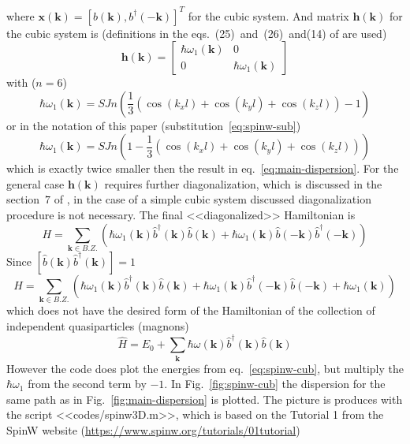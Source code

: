 \documentclass[a4paper,12pt]{article}
\begin{document}
        where $\mathbf{x}(\mathbf{k}) = [b(\mathbf{k}), b^{\dag}(-\mathbf{k})]^T$ for the cubic system. 
        And matrix $\mathbf{h}(\mathbf{k})$ for the cubic system is (definitions in the eqs.~(25)~and~(26)~and(14) of \cite{toth2015linear} are used)
        \begin{equation}
            \mathbf{h}(\mathbf{k}) = 
            \begin{bmatrix}
                \hbar\omega_1(\mathbf{k}) & 0 \\
                0 & \hbar\omega_1(\mathbf{k})
            \end{bmatrix}
        \end{equation}
        with ($n = 6$)
        \begin{equation}
            \hbar\omega_1(\mathbf{k}) = SJn\left(\dfrac{1}{3}\left(\cos(k_xl) + \cos(k_yl) + \cos(k_zl)\right) - 1\right)
        \end{equation}
        or in the notation of this paper (substitution~\eqref{eq:spinw-sub})
        \begin{equation}
            \hbar\omega_1(\mathbf{k}) = SJn\left(1 - \dfrac{1}{3}\left(\cos(k_xl) + \cos(k_yl) + \cos(k_zl)\right)\right)
        \end{equation}
        which is exactly twice smaller then the result in eq.~\eqref{eq:main-dispersion}.
        For the general case $\mathbf{h}(\mathbf{k})$ requires further diagonalization, which is discussed in the section~$7$ of \cite{toth2015linear}, 
        in the case of a simple cubic system discussed diagonalization procedure is not necessary.
        The final <<diagonalized>> Hamiltonian is 
        \begin{equation}
            H = \sum_{\mathbf{k} \in B.Z.}\left(\hbar\omega_1(\mathbf{k})\hat{b}^{\dag}(\mathbf{k})\hat{b}(\mathbf{k}) + \hbar\omega_1(\mathbf{k})\hat{b}(\mathbf{-k})\hat{b}^{\dag}(\mathbf{-k})\right)
        \end{equation}
        Since $[\hat{b}(\mathbf{k})\hat{b}^{\dag}(\mathbf{k})] = 1$
        \begin{equation}
            H = \sum_{\mathbf{k} \in B.Z.}\left(\hbar\omega_1(\mathbf{k})\hat{b}^{\dag}(\mathbf{k})\hat{b}(\mathbf{k}) + \hbar\omega_1(\mathbf{k})\hat{b}^{\dag}(\mathbf{-k})\hat{b}(\mathbf{-k}) + \hbar\omega_1(\mathbf{k})\right)
            \label{eq:spinw-cub}
        \end{equation}
        which does not have the desired form of the Hamiltonian of the collection of independent quasiparticles (magnons)
        \begin{equation}
            \hat{H} = E_0 + \sum_{\mathbf{k}}\hbar\omega(\mathbf{k})\hat{b}^{\dag}(\mathbf{k})\hat{b}(\mathbf{k})
        \end{equation}
        However the code does plot the energies from eq.~\eqref{eq:spinw-cub}, but multiply the $\hbar\omega_1$ from the second term by $-1$. 
        In Fig.~\ref{fig:spinw-cub} the dispersion for the same path as in Fig.~\ref{fig:main-dispersion} is plotted. 
        The picture is produces with the script <<codes/spinw3D.m>>, which is based on the Tutorial 1 from the SpinW website (\url{https://www.spinw.org/tutorials/01tutorial})
\end{document}

